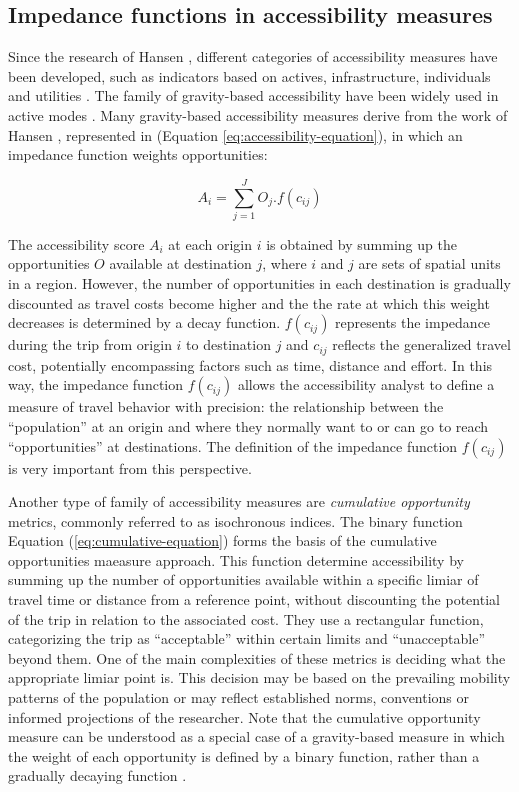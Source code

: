\documentclass[preprint, 3p,
authoryear]{elsarticle} %
\begin{document}
\subsection{Impedance functions in accessibility
measures}\label{impedance-functions-in-accessibility-measures}

Since the research of Hansen \citeyearpar{hansen1959accessibility},
different categories of accessibility measures have been developed, such
as indicators based on actives, infrastructure, individuals and
utilities \citep{geurs2004, páez2012}. The family of gravity-based
accessibility have been widely used in active modes
\citep{miller2005place}. Many gravity-based accessibility measures
derive from the work of Hansen \citeyearpar{hansen1959accessibility},
represented in (Equation \ref{eq:accessibility-equation}), in which an
impedance function weights opportunities:

\begin{equation}
A_{i} = \sum_{j=1}^J O_j .f(c_{ij})
\label{eq:accessibility-equation}
\end{equation}

The accessibility score \(A_{i}\) at each origin \(i\) is obtained by
summing up the opportunities \(O\) available at destination \(j\), where
\(i\) and \(j\) are sets of spatial units in a region. However, the
number of opportunities in each destination is gradually discounted as
travel costs become higher and the the rate at which this weight
decreases is determined by a decay function. \(f(c_{ij})\) represents
the impedance during the trip from origin \(i\) to destination \(j\) and
\(c_{ij}\) reflects the generalized travel cost, potentially
encompassing factors such as time, distance and effort. In this way, the
impedance function \(f(c_{ij})\) allows the accessibility analyst to
define a measure of travel behavior with precision: the relationship
between the ``population'' at an origin and where they normally want to
or can go to reach ``opportunities'' at destinations. The definition of
the impedance function \(f(c_{ij})\) is very important from this
perspective.

Another type of family of accessibility measures are \emph{cumulative
opportunity} metrics, commonly referred to as isochronous indices. The
binary function Equation (\ref{eq:cumulative-equation}) forms the basis
of the cumulative opportunities maeasure approach. This function
determine accessibility by summing up the number of opportunities
available within a specific limiar of travel time or distance from a
reference point, without discounting the potential of the trip in
relation to the associated cost. They use a rectangular function,
categorizing the trip as ``acceptable'' within certain limits and
``unacceptable'' beyond them. One of the main complexities of these
metrics is deciding what the appropriate limiar point is. This decision
may be based on the prevailing mobility patterns of the population or
may reflect established norms, conventions or informed projections of
the researcher. Note that the cumulative opportunity measure can be
understood as a special case of a gravity-based measure in which the
weight of each opportunity is defined by a binary function, rather than
a gradually decaying function \citep{pereira2023}.
\end{document}
